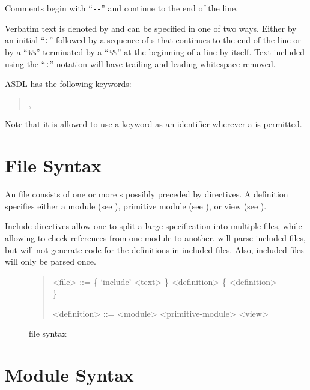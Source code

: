 Comments begin with ``\lstinline[language=ASDL]!--!''
and continue to the end of the line.

Verbatim text is denoted by  and can be specified in one of two ways.
Either by an initial ``\lstinline!:!'' followed by a sequence of s that
continues to the end of the line or by a ``\lstinline!%%!'' terminated by a ``\lstinline!%%!''
at the beginning of a line by itself. 
Text included using the ``\lstinline!:!'' notation will have trailing and leading 
whitespace removed.

ASDL has the following keywords:
\begin{quote}
     ,
     
\end{quote}%
Note that it is allowed to use a keyword as an identifier wherever a  is permitted.

\section{File Syntax}

An \asdl{} file consists of one or more s possibly preceded by 
directives.
A definition specifies either a module (see ),
primitive module (see ),
or view (see ).

Include directives allow one to split a large \asdl{} specification into multiple files,
while allowing \asdlgen{} to check references from one module to another.
\asdlgen{} will parse included files, but will not generate code for the definitions in included
files.
Also, included files will only be parsed once.

\begin{figure}[t]
  \begin{quote}
    \begin{grammar}
      <file>  ::=  \{ `include' <text> \} <definition> \{ <definition> \}
      
      <definition> ::= <module>
        \alt{} <primitive-module>
        \alt{} <view>
    \end{grammar}
  \end{quote}
  \caption{\asdl{} file syntax}
  \label{fig:file-syntax}
\end{figure}%

\section{Module Syntax}
\label{sec:module-syntax}

